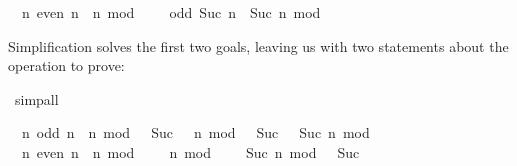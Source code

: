 \begin{isabellebody}
\begin{isamarkuptxt}
\begin{isabelle}
\ {}{\isachardot}\ {\isasymAnd}n{\isachardot}\ even\ n\ {\isacharequal}\ {\isacharparenleft}n\ mod\ {}\ {\isacharequal}\ {}{\isacharparenright}\ {\isasymLongrightarrow}\ odd\ {\isacharparenleft}Suc\ n{\isacharparenright}\ {\isacharequal}\ {\isacharparenleft}Suc\ n\ mod\ {}\ {\isacharequal}\ {}{\isacharparenright}%
\end{isabelle}
  Simplification solves the first two goals, leaving us with two
  statements about the  operation to prove:%
\end{isamarkuptxt}%
\isamarkuptrue%
\isamarkupfalse%
\ simp{\isacharunderscore}all%
\begin{isamarkuptxt}%
\begin{isabelle}%
\ {}{\isachardot}\ {\isasymAnd}n{\isachardot}\ odd\ n\ {\isacharequal}\ {\isacharparenleft}n\ mod\ {}\ {\isacharequal}\ Suc\ {}{\isacharparenright}\ {\isasymLongrightarrow}\ {\isacharparenleft}n\ mod\ {}\ {\isacharequal}\ Suc\ {}{\isacharparenright}\ {\isacharequal}\ {\isacharparenleft}Suc\ n\ mod\ {}\ {\isacharequal}\ {}{\isacharparenright}\isanewline
\ {}{\isachardot}\ {\isasymAnd}n{\isachardot}\ even\ n\ {\isacharequal}\ {\isacharparenleft}n\ mod\ {}\ {\isacharequal}\ {}{\isacharparenright}\ {\isasymLongrightarrow}\ {\isacharparenleft}n\ mod\ {}\ {\isacharequal}\ {}{\isacharparenright}\ {\isacharequal}\ {\isacharparenleft}Suc\ n\ mod\ {}\ {\isacharequal}\ Suc\ {}{\isacharparenright}%
\end{isabelle} 


\end{isamarkuptxt}
\end{isabellebody}
